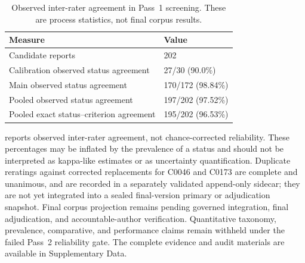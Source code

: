\begin{table}[t]
  \centering
  \caption{Observed inter-rater agreement in Pass~1 screening. These are process
  statistics, not final corpus results.}
  \label{tab:screening-checkpoint}
  \small
  \begin{tabularx}{\linewidth}{@{}lY@{}}
    \toprule
    Measure & Value \\
    \midrule
    Candidate reports & 202 \\
    Calibration observed status agreement & 27/30 (90.0\%) \\
    Main observed status agreement & 170/172 (98.84\%) \\
    Pooled observed status agreement & 197/202 (97.52\%) \\
    Pooled exact status--criterion agreement & 195/202 (96.53\%) \\
    \bottomrule
  \end{tabularx}
\end{table}

 reports observed inter-rater agreement, not
chance-corrected reliability. These percentages may be inflated by the prevalence
of a status and should not be interpreted as kappa-like estimates or as uncertainty
quantification. Duplicate reratings against corrected replacements for C0046 and C0173
are complete and unanimous, and are recorded in a separately validated append-only
sidecar; they are not yet integrated into a sealed final-version primary or adjudication
snapshot. Final corpus projection remains pending governed integration, final
adjudication, and accountable-author verification.
Quantitative taxonomy, prevalence, comparative, and performance claims remain withheld
under the failed Pass~2 reliability gate. The complete evidence and audit materials are
available in Supplementary Data.
